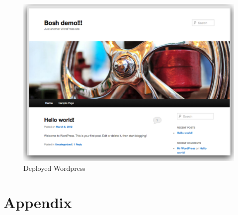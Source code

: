 \begin{figure}[htbp]
\centering
\includegraphics[keepaspectratio,width=\textwidth,height=0.75\textheight]{deployed.pdf}
\caption{Deployed Wordpress}
\label{}
\end{figure}



\section{Appendix}
\label{appendix}

